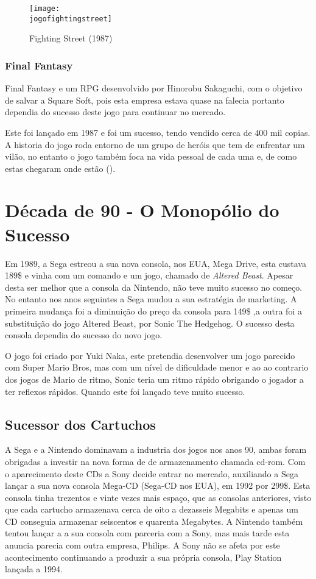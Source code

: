 \documentclass{report}
\begin{document}
\begin{figure}[h]
\center
\texttt{[image: \\jogofightingstreet]}
\caption{Fighting Street (1987) \cite{streetfighter}}
\label{street}
\end{figure}

\subsubsection{Final Fantasy}
\label{subsub.Final Fantasy}
Final Fantasy e um RPG desenvolvido por Hinorobu Sakaguchi, com o objetivo de salvar a Square Soft, pois esta empresa estava quase na falecia portanto dependia do sucesso deste jogo para continuar no mercado.

Este foi lançado em 1987 e foi um sucesso, tendo vendido cerca de 400 mil copias. A historia do jogo roda entorno de um grupo de heróis que tem de enfrentar um vilão, no entanto o jogo também foca na vida pessoal de cada uma e, de como estas chegaram onde estão (\cite{finalfantasy}).

\section{Década de 90 - O Monopólio  do Sucesso}
\label{sec.Década de 90 - O Monópolio do Sucesso }
Em 1989, a Sega estreou a sua nova consola, nos EUA, Mega Drive, esta custava 189\$ e vinha com um comando e um jogo, chamado de \textit{Altered Beast}. Apesar desta ser melhor que a consola da Nintendo, não teve muito sucesso no começo. No entanto nos anos seguintes a Sega mudou a sua estratégia de marketing. A primeira mudança foi a diminuição do preço da consola para 149\$ ,a outra foi a substituição do jogo Altered Beast, por Sonic The Hedgehog. O sucesso desta consola dependia do sucesso do novo jogo.

O jogo foi criado por Yuki Naka, este pretendia desenvolver um jogo parecido com Super Mario Bros, mas com um nível de dificuldade menor e ao ao contrario dos jogos de Mario de ritmo, Sonic teria um ritmo rápido obrigando o jogador a ter reflexos rápidos. Quando este foi lançado teve muito sucesso.

\subsection{Sucessor dos Cartuchos}
\label{subsec.Sucessor dos Cartuchos}
A Sega e a Nintendo dominavam a industria dos jogos nos anos 90, ambas foram obrigadas a investir na nova forma de de armazenamento chamada \ac{cd-rom}.
Com o aparecimento deste CDs a Sony decide entrar no mercado, auxiliando a Sega lançar a sua nova consola Mega-CD (Sega-CD nos EUA), em 1992 por 299\$. Esta consola tinha trezentos e vinte vezes mais espaço, que as consolas anteriores, visto que cada cartucho armazenava cerca de oito a dezasseis Megabits e apenas um CD conseguia armazenar seiscentos e quarenta Megabytes.
A Nintendo também tentou lançar a a sua consola com parceria com a Sony, mas mais tarde esta anuncia parecia com outra empresa, Philips. A Sony não se afeta por este acontecimento continuando a produzir a sua própria consola, Play Station lançada a 1994.
\end{document}
